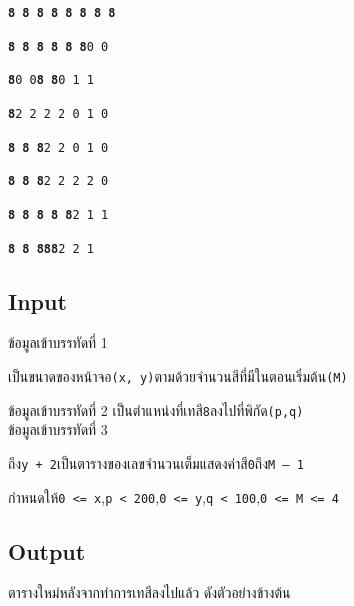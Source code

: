 \documentclass{article}
\begin{document}
\textbf{\texttt{8\ 8\ 8\ 8\ 8\ 8\ 8\ 8}}



\textbf{\texttt{8\ 8\ 8\ 8\ 8\ 8}}\texttt{0\ 0}



\textbf{\texttt{8}}\texttt{0\ 0}\textbf{\texttt{8\ 8}}\texttt{0\ 1\ 1}



\textbf{\texttt{8}}\texttt{2\ 2\ 2\ 2\ 0\ 1\ 0}



\textbf{\texttt{8\ 8\ 8}}\texttt{2\ 2\ 0\ 1\ 0}



\textbf{\texttt{8\ 8\ 8}}\texttt{2\ 2\ 2\ 2\ 0}



\textbf{\texttt{8\ 8\ 8\ 8\ 8}}\texttt{2\ 1\ 1}



\textbf{\texttt{8\ 8\ 8}}{\textbf{\texttt{8}}{\textbf{\texttt{8}}\texttt{2\ 2\ 1}}}



\subsection*{Input}
ข้อมูลเข้าบรรทัดที่ 1

เป็นขนาดของหน้าจอ\texttt{(x,\ y)}ตามด้วยจำนวนสีที่มีในตอนเริ่มต้น\texttt{(M)}



ข้อมูลเข้าบรรทัดที่ 2 เป็นตำแหน่งที่เทสี\texttt{8}ลงไปที่พิกัด\texttt{(p,q)}\\



ข้อมูล{เข้า}บรรทัดที่ 3

ถึง\texttt{y\ +\ 2}เป็นตารางของเลขจำนวนเต็มแสดงค่าสี\texttt{0}ถึง\texttt{M\ –\ 1}



\hfill\break



กำหนดให้\texttt{0\ \textless{}=\ x},\texttt{p\ \textless{}\ 200},\texttt{0\ \textless{}=\ y},\texttt{q\ \textless{}\ 100},\texttt{0\ \textless{}=\ M\ \textless{}=\ 4}\\



\subsection*{Output}
ตารางใหม่หลังจากทำการเทสีลงไปแล้ว ดังตัวอย่างข้างต้น
\end{document}

